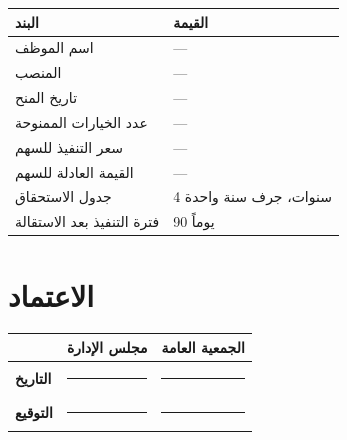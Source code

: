 \documentclass[11pt,a4paper]{article}
\begin{document}
\begin{table}[H]
\centering
\renewcommand{\arraystretch}{1.5}
\begin{tabularx}{\textwidth}{L{6cm} X}
\toprule
\textbf{البند} & \textbf{القيمة} \\
\midrule
اسم الموظف & --- \\
المنصب & --- \\
تاريخ المنح & --- \\
عدد الخيارات الممنوحة & --- \\
سعر التنفيذ للسهم & ---  \\
القيمة العادلة للسهم & ---  \\
جدول الاستحقاق & 4 سنوات، جرف سنة واحدة \\
فترة التنفيذ بعد الاستقالة & 90 يوماً \\
\bottomrule
\end{tabularx}
\end{table}

\vspace{2em}
\section*{الاعتماد}

\begin{table}[H]
\centering
\renewcommand{\arraystretch}{2.5}
\begin{tabularx}{\textwidth}{L{5cm} X X}
\toprule
& \textbf{مجلس الإدارة} & \textbf{الجمعية العامة} \\
\midrule
\textbf{التاريخ} & \rule{4cm}{0.4pt} & \rule{4cm}{0.4pt} \\
\textbf{التوقيع} & \rule{4cm}{0.4pt} & \rule{4cm}{0.4pt} \\
\bottomrule
\end{tabularx}
\end{table}
\end{document}
